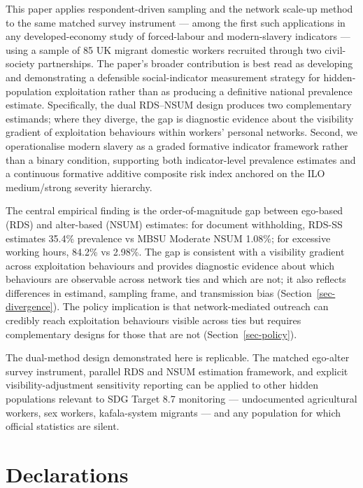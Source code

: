 \documentclass[
  12pt,
  letterpaper,
  DIV=11,
  numbers=noendperiod]{scrartcl}
\begin{document}
This paper applies respondent-driven sampling and the network scale-up
method to the same matched survey instrument --- among the first such
applications in any developed-economy study of forced-labour and
modern-slavery indicators --- using a sample of 85 UK migrant domestic
workers recruited through two civil-society partnerships. The paper's
broader contribution is best read as developing and demonstrating a
defensible social-indicator measurement strategy for hidden-population
exploitation rather than as producing a definitive national prevalence
estimate. Specifically, the dual RDS--NSUM design produces two
complementary estimands; where they diverge, the gap is diagnostic
evidence about the visibility gradient of exploitation behaviours within
workers' personal networks. Second, we operationalise modern slavery as
a graded formative indicator framework rather than a binary condition,
supporting both indicator-level prevalence estimates and a continuous
formative additive composite risk index anchored on the ILO
medium/strong severity hierarchy.

The central empirical finding is the order-of-magnitude gap between
ego-based (RDS) and alter-based (NSUM) estimates: for document
withholding, RDS-SS estimates 35.4\% prevalence vs MBSU Moderate NSUM
1.08\%; for excessive working hours, 84.2\% vs 2.98\%. The gap is
consistent with a visibility gradient across exploitation behaviours and
provides diagnostic evidence about which behaviours are observable
across network ties and which are not; it also reflects differences in
estimand, sampling frame, and transmission bias
(Section~\ref{sec-divergence}). The policy implication is that
network-mediated outreach can credibly reach exploitation behaviours
visible across ties but requires complementary designs for those that
are not (Section~\ref{sec-policy}).

The dual-method design demonstrated here is replicable. The matched
ego-alter survey instrument, parallel RDS and NSUM estimation framework,
and explicit visibility-adjustment sensitivity reporting can be applied
to other hidden populations relevant to SDG Target 8.7 monitoring ---
undocumented agricultural workers, sex workers, kafala-system migrants
--- and any population for which official statistics are silent.

\section{Declarations}\label{sec-declarations}
\end{document}
